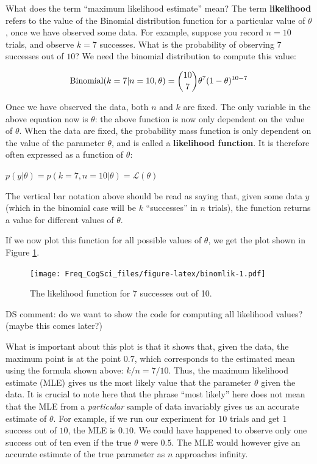 \documentclass[12pt,]{krantz}
\makeatletter
\newenvironment{kframe}{%
\medskip{}
\setlength{\fboxsep}{.8em}
 \def\at@end@of@kframe{}%
 \ifinner\ifhmode%
  \def\at@end@of@kframe{\end{minipage}}%
  \begin{minipage}{\columnwidth}%
 \fi\fi%
 \def\FrameCommand##1{\hskip\@totalleftmargin \hskip-\fboxsep
 \colorbox{shadecolor}{##1}\hskip-\fboxsep
     \hskip-\linewidth \hskip-\@totalleftmargin \hskip\columnwidth}%
 \MakeFramed {\advance\hsize-\width
   \@totalleftmargin\z@ \linewidth\hsize
   \@setminipage}}%
 {\par\unskip\endMakeFramed%
 \at@end@of@kframe}
\newenvironment{rmdblock}[1]
  {
  \begin{itemize}
  \renewcommand{\labelitemi}{
    \raisebox{-.7\height}[0pt][0pt]{
      {\setkeys{Gin}{width=3em,keepaspectratio}\texttt{[image: images/\#1]}}
    }
  }
  \setlength{\fboxsep}{1em}
  \begin{kframe}
  \item
  }
  {
  \end{kframe}
  \end{itemize}
  }
\newenvironment{rmdnote}
  {\begin{rmdblock}{note}}
  {\end{rmdblock}}
\makeatother
\begin{document}
What does the term ``maximum likelihood estimate'' mean? The term \textbf{likelihood} refers to the value of the Binomial distribution function for a particular value of \(\theta\), once we have observed some data. For example, suppose you record \(n=10\) trials, and observe \(k=7\) successes. What is the probability of observing \(7\) successes out of \(10\)? We need the binomial distribution to compute this value:

\begin{equation}
\hbox{Binomial}(k=7|n=10,\theta) = 
\binom{10}{7} \theta^{7} (1-\theta)^{10-7}
\end{equation}

Once we have observed the data, both \(n\) and \(k\) are fixed. The only variable in the above equation now is \(\theta\): the above function is now only dependent on the value of \(\theta\). When the data are fixed, the probability mass function is only dependent on the value of the parameter \(\theta\), and is called a \textbf{likelihood function}. It is therefore often expressed as a function of \(\theta\):

\(p( y | \theta ) = p( k=7, n=10 | \theta) = \mathcal{L}(\theta)\)

The vertical bar notation above should be read as saying that, given some data \(y\) (which in the binomial case will be \(k\) ``successes'' in \(n\) trials), the function returns a value for different values of \(\theta\).

If we now plot this function for all possible values of \(\theta\), we get the plot shown in Figure \ref{fig:binomlik}.

\begin{figure}
\centering
\texttt{[image: Freq\_CogSci\_files/figure-latex/binomlik-1.pdf]}
\caption{\label{fig:binomlik}The likelihood function for 7 successes out of 10.}
\end{figure}

\begin{rmdnote}
DS comment: do we want to show the code for computing all likelihood values? (maybe this comes later?)
\end{rmdnote}

What is important about this plot is that it shows that, given the data, the maximum point is at the point \(0.7\), which corresponds to the estimated mean using the formula shown above: \(k/n = 7/10\). Thus, the maximum likelihood estimate (MLE) gives us the most likely value that the parameter \(\theta\) given the data. It is crucial to note here that the phrase ``most likely'' here does not mean that the MLE from a \emph{particular} sample of data invariably gives us an accurate estimate of \(\theta\). For example, if we run our experiment for \(10\) trials and get \(1\) success out of \(10\), the MLE is \(0.10\). We could have happened to observe only one success out of ten even if the true \(\theta\) were \(0.5\). The MLE would however give an accurate estimate of the true parameter as \(n\) approaches infinity.
\end{document}
